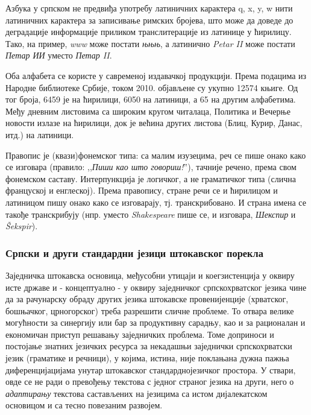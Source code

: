 {\begin{multicols}{2}
Азбука у српском не предвиђа употребу латиничних карактера q, x, y, w нити латиничних карактера за записивање римских бројева, што може да доведе до деградације информације приликом транслитерације из латинице у ћирилицу. Тако, на пример, \textit{www} може постати \textit{њњњ}, а латинично \textit{Petar II} може постати \textit{Петар ИИ} уместо \textit{Петар II}. 

Оба алфабета се користе у савременој издавачкој продукцији. Према подацима из Народне библиотеке Србије, током 2010. објављене су укупно 12574 књиге. Од тог броја, 6459 је на ћирилици, 6050 на латиници, а 65 на другим алфабетима. Међу дневним листовима са широким кругом читалаца, Политика и Вечерње новости излазе на ћирилици, док је већина других листова (Блиц, Курир, Данас, итд.) на латиници. 

Правопис је (квази)фонемског типа: са малим изузецима, реч се пише онако како се изговара (правило: ,,\textit{Пиши као што говориш!}''), тачније речено, према свом фонемском саставу.
Интерпункција је логичког, а не граматичког типа (слична француској и енглеској).
Према правопису, стране речи се и ћирилицом и латиницом пишу онако како се изговарају, тј. транскрибовано. И страна имена се такође транскрибују (нпр. уместо \textit{Shakespeare} пише се, и изговара, \textit{Шекспир} и \textit{Šekspir}).

\subsubsection {Српски и други стандардни језици штокавског порекла}
  
Заједничка штокавска основица, међусобни утицаји и коегзистенција у оквиру исте државе и - концептуално - у оквиру заједничког српскохрватског језика чине да за рачунарску обраду других језика  штокавске провенијенције (хрватског, бошњачког, црногорског) треба разрешити сличне проблеме. То отвара велике могућности за синергију или бар за продуктивну сарадњу, као и за  рационалан и економичан приступ решавању заједничких проблема. Томе доприноси и постојање знатних језичких ресурса за некадашњи заједнички српскохрватски језик (граматике и речници), у којима, истина, није поклањана дуж\-на пажња диференцијацијама унутар штокавског стандарднојезичког простора. У ствари, овде се не ради о превођењу текстова с једног страног језика на други, него о \textit{адаптирању} текстова састављених на језицима са истом дијалекатском основицом и са тесно повезаним развојем. 


\end{multicols}}
